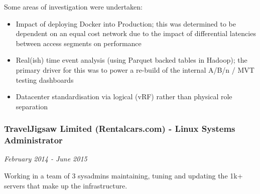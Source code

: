 Some areas of investigation were undertaken:

\begin{itemize}
\tightlist
\item
  Impact of deploying Docker into Production; this was determined to be
  dependent on an equal cost network due to the impact of differential
  latencies between access segments on performance
\item
  Real(ish) time event analysis (using Parquet backed tables in Hadoop);
  the primary driver for this was to power a re-build of the internal
  A/B/n / MVT testing dashboards
\item
  Datacenter standardisation via logical (vRF) rather than physical role
  separation
\end{itemize}

\subsubsection{TravelJigsaw Limited (Rentalcars.com) - Linux Systems
Administrator}\label{traveljigsaw-limited-rentalcars.com---linux-systems-administrator}

\emph{February 2014 - June 2015}

Working in a team of 3 sysadmins maintaining, tuning and updating the
1k+ servers that make up the infrastructure.

